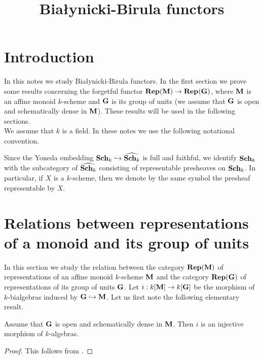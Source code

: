 



\title{Bia{\l}ynicki-Birula functors}
\date{}
\maketitle

\section{Introduction}
\noindent
In this notes we study Bia{\l}ynicki-Birula functors. In the first section we prove some results concerning the forgetful functor $\mathbf{Rep}(\mathbf{M})\rightarrow \mathbf{Rep}(\mathbf{G})$, where $\mathbf{M}$ is an affine monoid $k$-scheme and $\mathbf{G}$ is its group of units (we assume that $\mathbf{G}$ is open and schematically dense in $\mathbf{M}$). These results will be used in the following sections.\\
We assume that $k$ is a field. In these notes we use the following notational convention.

\begin{remark}\label{remark:notational_convention_identyfication_of_schemes_and_representable_preheaves}
Since the Yoneda embedding $\mathbf{Sch}_k\hookrightarrow \widehat{\mathbf{Sch}_k}$ is full and faithful, we identify $\mathbf{Sch}_k$ with the subcategory of $\widehat{\mathbf{Sch}_k}$ consisting of representable presheaves on $\mathbf{Sch}_k$. In particular, if $X$ is a $k$-scheme, then we denote by the same symbol the presheaf representable by $X$.
\end{remark}

\section{Relations between representations of a monoid and its group of units}
\noindent
In this section we study the relation between the category $\mathbf{Rep}(\mathbf{M})$ of representations of an affine monoid $k$-scheme $\mathbf{M}$ and the category $\mathbf{Rep}(\mathbf{G})$ of representations of its group of units $\mathbf{G}$. Let $i:k[\mathbf{M}]\rightarrow k[\mathbf{G}]$ be the morphism of $k$-bialgebras induced by $\mathbf{G}\hookrightarrow \mathbf{M}$. Let us first note the following elementary result.

\begin{fact}\label{fact:monoid_bialgebra_injects_into_group_bialgebra_if_units_are_open_and_schematically_dense}
Assume that $\mathbf{G}$ is open and schematically dense in $\mathbf{M}$. Then $i$ is an injective morphism of $k$-algebras.
\end{fact}
\begin{proof}
This follows from {\cite[Proposition 9.19]{gortz2010algebraic}}.
\end{proof}

